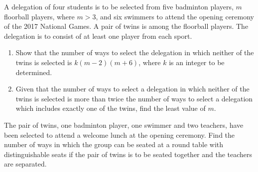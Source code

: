 \begin{problem}[\chili]
    A delegation of four students is to be selected from five badminton players, $m$ floorball players, where $m > 3$, and six swimmers to attend the opening ceremony of the 2017 National Games. A pair of twins is among the floorball players. The delegation is to consist of at least one player from each sport.

    \begin{enumerate}
        \item Show that the number of ways to select the delegation in which neither of the twins is selected is $k(m-2)(m+6)$, where $k$ is an integer to be determined.
        \item Given that the number of ways to select a delegation in which neither of the twins is selected is more than twice the number of ways to select a delegation which includes exactly one of the twins, find the least value of $m$.
    \end{enumerate}

    The pair of twins, one badminton player, one swimmer and two teachers, have been selected to attend a welcome lunch at the opening ceremony. Find the number of ways in which the group can be seated at a round table with distinguishable seats if the pair of twins is to be seated together and the teachers are separated.
\end{problem}
